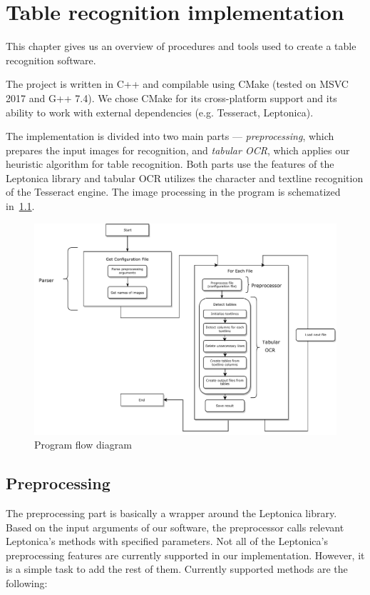 \chapter{Table recognition implementation}

This chapter gives us an overview of procedures and tools used to create a table recognition software. 

The project is written in C++ and compilable using CMake (tested on MSVC 2017 and G++ 7.4). We chose CMake for its cross-platform support and its ability to work with external dependencies (e.g. Tesseract, Leptonica). 

The implementation is divided into two main parts --- \emph{preprocessing}, which prepares the input images for recognition, and \emph{tabular OCR}, which applies our heuristic algorithm for table recognition. Both parts use the features of the Leptonica library and tabular OCR utilizes the character and textline recognition of the Tesseract engine. The image processing in the program is schematized in~\cref{fig:programFlow}.

\begin{figure}
    \centering
	\includegraphics[width=1.0\linewidth]{img/implementation/programFlow.pdf}
	\caption{Program flow diagram}
	\label{fig:programFlow}
\end{figure}

\section{Preprocessing}

The preprocessing part is basically a wrapper around the Leptonica library. Based on the input arguments of our software, the preprocessor calls relevant Leptonica's methods with specified parameters. Not all of the Leptonica's preprocessing features are currently supported in our implementation. However, it is a simple task to add the rest of them. Currently supported methods are the following:

